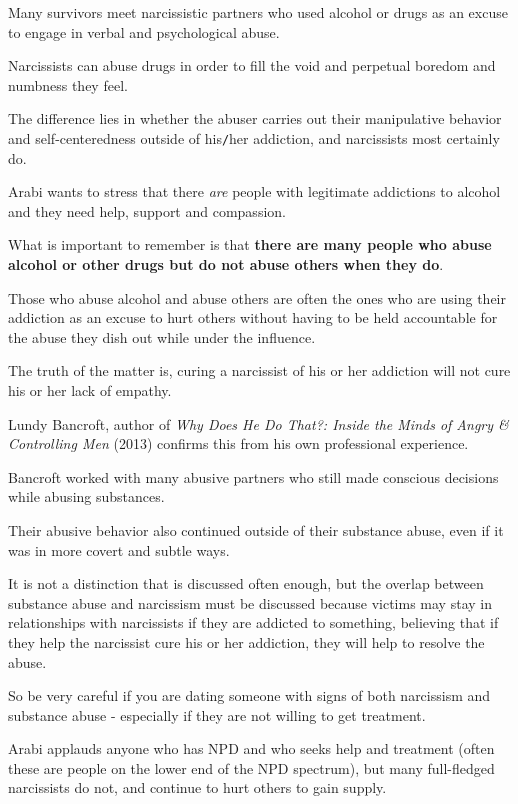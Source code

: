 \documentclass[oneside]{book}
\numberwithin{equation}{section}
\begin{document}
Many survivors meet narcissistic partners who used alcohol or drugs as an excuse to engage in verbal and psychological abuse.

Narcissists can abuse drugs in order to fill the void and perpetual boredom and numbness they feel.

The difference lies in whether the abuser carries out their manipulative behavior and self-centeredness outside of his\texttt{/}her addiction, and narcissists most certainly do.

%
Arabi wants to stress that there \textit{are} people with legitimate addictions to alcohol and they need help, support and compassion.

What is important to remember is that \textbf{there are many people who abuse alcohol or other drugs but do not abuse others when they do}.

Those who abuse alcohol and abuse others are often the ones who are using their addiction as an excuse to hurt others without having to be held accountable for the abuse they dish out while under the influence.

The truth of the matter is, curing a narcissist of his or her addiction will not cure his or her lack of empathy.

Lundy Bancroft, author of \textit{Why Does He Do That?: Inside the Minds of Angry \& Controlling Men} (2013) confirms this from his own professional experience.

Bancroft worked with many abusive partners who still made conscious decisions while abusing substances.

Their abusive behavior also continued outside of their substance abuse, even if it was in more covert and subtle ways.

%
It is not a distinction that is discussed often enough, but the overlap between substance abuse and narcissism must be discussed because victims may stay in relationships with narcissists if they are addicted to something, believing that if they help the narcissist cure his or her addiction, they will help to resolve the abuse.


So be very careful if you are dating someone with signs of both narcissism and substance abuse - especially if they are not willing to get treatment.

%
Arabi applauds anyone who has NPD and who seeks help and treatment (often these are people on the lower end of the NPD spectrum), but many full-fledged narcissists do not, and continue to hurt others to gain supply.
\end{document}
